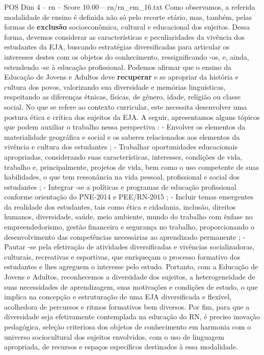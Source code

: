 \begin{textsample}{POS Dim 4 – rn – Score 10.00 – rn/rn\_em\_16.txt}
Como observamos, a referida modalidade de ensino é definida não só pelo recorte etário, mas, também, pelas formas de \textbf{exclusão} socioeconômica, cultural e educacional dos sujeitos.
Dessa forma, devemos considerar as características e peculiaridades da vivência dos estudantes da EJA, buscando estratégias diversificadas para articular os interesses destes com os objetos do conhecimento, ressignificando -os, e, ainda, estendendo -se à educação profissional.
Podemos afirmar que o ensino da Educação de Jovens e Adultos deve \textbf{recuperar} e se apropriar da história e cultura dos povos, valorizando sua diversidade e memórias linguísticas, respeitando as diferenças étnicas, físicas, de gênero, idade, religião ou classe social.
No que se refere ao contexto curricular, este necessita desenvolver uma postura ética e crítica dos sujeitos da EJA.
A seguir, apresentamos alguns tópicos que podem auxiliar o trabalho nessa perspectiva : - Envolver os elementos da materialidade geográfica e social e os saberes relacionados aos elementos da vivência e cultura dos estudantes ; - Trabalhar oportunidades educacionais apropriadas, considerando suas características, interesses, condições de vida, trabalho e, principalmente, projetos de vida, bem como o uso competente de suas habilidades, o que tem ressonância na vida pessoal, profissional e social dos estudantes ; - Integrar -se a políticas e programas de educação profissional conforme orientação do PNE-2014 e PEE/RN-2015 ; - Incluir temas emergentes da realidade dos estudantes, tais como ética e cidadania, inclusão, direitos humanos, diversidade, saúde, meio ambiente, mundo do trabalho com ênfase no empreendedorismo, gestão financeira e segurança no trabalho, proporcionando o desenvolvimento das competências necessárias ao aprendizado permanente ; - Pautar -se pela efetivação de atividades diversificadas e vivências socializadoras, culturais, recreativas e esportivas, que enriqueçam o processo formativo dos estudantes e lhes agreguem o interesse pelo estudo.
Portanto, com a Educação de Jovens e Adultos, reconhecemos a diversidade dos sujeitos, a heterogeneidade de suas necessidades de aprendizagem, suas motivações e condições de estudo, o que implica na concepção e estruturação de uma EJA diversificada e flexível, acolhedora de percursos e ritmos formativos bem diversos.
Por fim, para que a diversidade seja efetivamente contemplada na educação do RN, é preciso inovação pedagógica, seleção criteriosa dos objetos de conhecimento em harmonia com o universo sociocultural dos sujeitos envolvidos, com o uso de linguagem apropriada, de recursos e espaços específicos destinados à essa modalidade.

\end{textsample}
